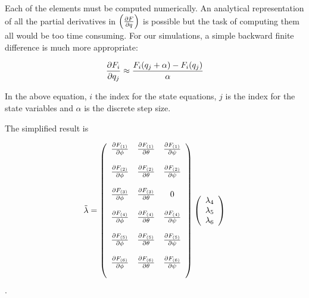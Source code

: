Each of the elements must be computed numerically. An analytical representation of all the partial derivatives in $\left(\frac{\partial F}{\partial q}\right)$ is possible but the task of computing them all would be too time consuming. For our simulations, a simple backward finite difference is much more appropriate:

\begin{equation}
    \frac{\partial F_i}{\partial q_j} \approx \frac{ F_i(q_j + \alpha) - F_i(q_j)  }{\alpha}
\end{equation}

In the above equation, $i$ the index for the state equations, $j $ is the index for the state variables and $\alpha $ is the discrete step size.

The simplified result is

\begin{equation}
    \ddot \lambda = \left(
    \begin{array}{c c c c c c}
    \frac{\partial F_{(1)}}{\partial \phi} & \frac{\partial F_{(1)}}{\partial \theta} & \frac{\partial F_{(1)}}{\partial \psi}\\\\

    \frac{\partial F_{(2)}}{\partial \phi} & \frac{\partial F_{(2)}}{\partial \theta} & \frac{\partial F_{(2)}}{\partial \psi}\\\\

    \frac{\partial F_{(3)}}{\partial \phi} & \frac{\partial F_{(3)}}{\partial \theta} & 0\\\\

    \frac{\partial F_{(4)}}{\partial \phi} & \frac{\partial F_{(4)}}{\partial \theta} & \frac{\partial F_{(4)}}{\partial \psi}\\\\

    \frac{\partial F_{(5)}}{\partial \phi} & \frac{\partial F_{(5)}}{\partial \theta} & \frac{\partial F_{(5)}}{\partial \psi}\\\\

    \frac{\partial F_{(6)}}{\partial \phi} & \frac{\partial F_{(6)}}{\partial \theta} & \frac{\partial F_{(6)}}{\partial \psi}\\\\

    \end{array}\right)\left(\begin{array}{c} \lambda_4\\  \lambda_5\\ \lambda_6\\ \end{array}\right)
\end{equation}.



